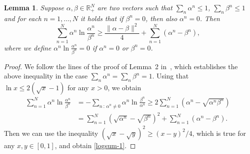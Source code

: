 \documentclass[a4paper,11pt,english]{article}
\newtheorem{lemma}{Lemma}
\theoremstyle{definition}
\newcommand{\R}{\mathbb{R}}
\begin{document}
\begin{lemma}
\label{lemma-logsum}
Suppose $\alpha,\beta\in\R_+^N$ are two vectors such that
$\sum_n \alpha^n \le 1$, $\sum_n \beta^n \le 1$ and for each $n=1,\ldots,N$ it
holds that if $\beta^n=0$, then also $\alpha^n=0$. Then 
\begin{equation}
\sum_{n=1}^N\alpha^n \ln\frac{\alpha^n}{\beta^n} \ge
\frac{\|\alpha-\beta\|^2}{4} + \sum_{n=1}^N (\alpha^n-\beta^n),\label{logsum-1}
\end{equation}
where we define $\alpha^n \ln\frac{\alpha^n}{\beta^n} = 0$ if $\alpha^n=0$ or $\beta^n=0$.
\end{lemma}
\begin{proof}
We follow the lines of the proof of Lemma~2 in~\cite{AmirEvstigneev+13},
which establishes the above inequality in the case $\sum_n \alpha^n =
\sum_n \beta^n=1$.
Using that $\ln x \le 2(\sqrt x -1)$ for any $x>0$, we obtain
\[
\begin{split}
\sum_{n=1}^N \alpha^n \ln\frac{\alpha^n}{\beta^n} &= -\sum_{n\,:\,\alpha^n\neq 0}\alpha^n\ln\frac{\beta^n}{\alpha^n} \ge
2\sum_{n=1}^N (\alpha^n-\sqrt{\alpha^n\beta^n}) \\&= \sum_{n=1}^N(\sqrt{\alpha^n} -
\sqrt{\beta^n})^2 + \sum_{n=1}^N (\alpha^n - \beta^n).
\end{split}
\]
Then we can use the inequality $(\sqrt x - \sqrt y)^2 \ge (x-y)^2/4$, which
is true for any $x,y\in[0,1]$, and obtain \eqref{logsum-1}. 
\end{proof}
\end{document}
